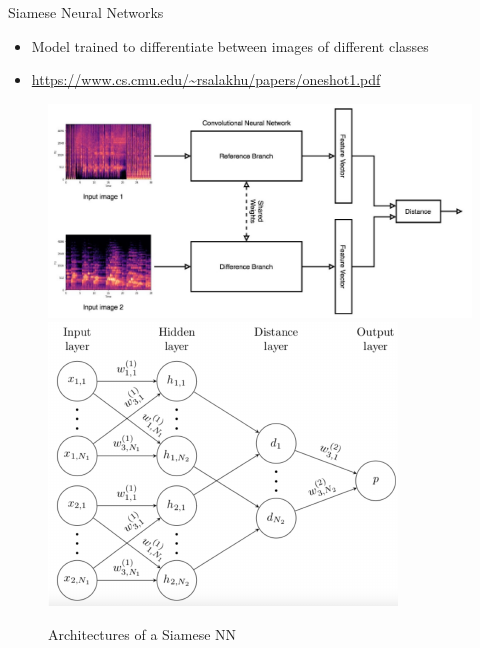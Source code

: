 \begin{frame}{Siamese Neural Networks}

\begin{itemize}
\item Model trained to differentiate between images of different classes 
\item \url{https://www.cs.cmu.edu/~rsalakhu/papers/oneshot1.pdf}  
\end{itemize}

\begin{figure}
    \centering
    \includegraphics[scale=0.18]{images/siamese.png}
    \includegraphics[scale=0.6]{images/siamese2.png}
    \caption{Architectures of a Siamese NN}
\end{figure}

\end{frame}

